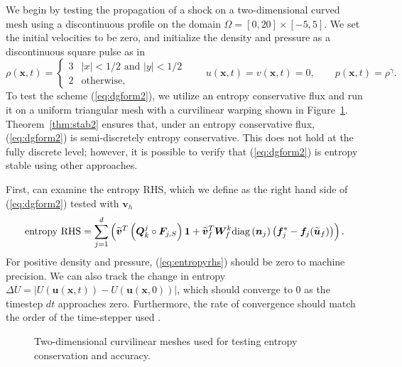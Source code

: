 \documentclass[preprint,10pt]{article}
\theoremstyle{definition}
\theoremstyle{lemma}
\theoremstyle{theorem}
\theoremstyle{assumption}
\renewcommand{\tilde}{\widetilde}
\newcommand{\LRp}[1]{\left( #1 \right)}
\newcommand{\LRb}[1]{\left| #1 \right|}
\newcommand{\diag}[1]{{\rm diag}\LRp{#1}}
\begin{document}
{We begin by testing the propagation of a shock on a two-dimensional curved mesh using a discontinuous profile on the domain $\Omega = [0,20] \times [-5,5]$.   We set the initial velocities to be zero, and initialize the density and pressure as a discontinuous square pulse as in \cite{chan2017discretely}
\begin{equation}
\rho(\bm{x},t) = \begin{cases}
3 & \LRb{x} < 1/2 \text{ and } \LRb{y} < 1/2\\
2 & \text{otherwise},
\end{cases} \qquad 
u(\bm{x},t) = v(\bm{x},t) = 0, \qquad
p(\bm{x},t) = \rho^\gamma.
\label{eq:discontin}
\end{equation}
To test the scheme (\ref{eq:dgform2}), we utilize an entropy conservative flux and run it on a uniform triangular mesh with a curvilinear warping shown in Figure~\ref{fig:warp2d}.   Theorem~\ref{thm:stab2} ensures that, under an entropy conservative flux, (\ref{eq:dgform2}) is semi-discretely entropy conservative.  This does not hold at the fully discrete level; however, it is possible to verify that (\ref{eq:dgform2}) is entropy stable using other approaches.  

First, can examine the entropy RHS, which we define as the right hand side of (\ref{eq:dgform2}) tested with $\bm{v}_h$
\begin{equation}
  \text{entropy RHS}= \sum_{j=1}^d\LRp{ \tilde{\bm{v}}^T\LRp{\bm{Q}^j_k \circ \bm{F}_{j,S}}\bm{1} + \tilde{\bm{v}}_f^T\bm{W}_f^k \diag{\bm{n}_j}\LRp{\bm{f}_j^* - \bm{f}_j(\tilde{\bm{u}}_f)}}.  
\label{eq:entropyrhs}
\end{equation}
For positive density and pressure, (\ref{eq:entropyrhs}) should be zero to machine precision.  We can also track the change in entropy $\Delta U = \LRb{U(\bm{u}(\bm{x},t))-U(\bm{u}(\bm{x},0))}$, which should converge to $0$ as the timestep $dt$ approaches zero.  Furthermore, the rate of convergence should match the order of the time-stepper used \cite{gassner2016well,chan2017discretely}.  

\begin{figure}
\centering
{}
\hspace{1em}
\caption{Two-dimensional curvilinear meshes used for testing entropy conservation and accuracy.}
\label{fig:warp2d}
\end{figure}

}
\end{document}
